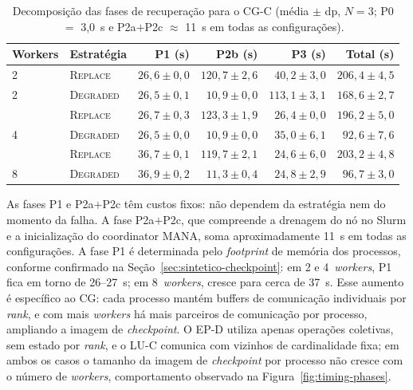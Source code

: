 \begin{table}[htb]
  \caption{Decomposição das fases de recuperação para o CG-C (média $\pm$ dp, $N=3$;
           P0 $=$ 3,0~s e P2a$+$P2c $\approx$ 11~s em todas as configurações).}
  \label{tab:cg-breakdown}
  \centering
  \small
  \begin{tabular}{l l r r r r}
    \toprule
    Workers & Estratégia & P1 (s) & P2b (s) & P3 (s) & Total (s) \\
    \midrule
    2 & \textsc{Replace}  & $26{,}6 \pm 0{,}0$ & $120{,}7 \pm 2{,}6$ & $40{,}2 \pm 3{,}0$  & $206{,}4 \pm 4{,}5$ \\
    2 & \textsc{Degraded} & $26{,}5 \pm 0{,}1$ & $10{,}9 \pm 0{,}0$  & $113{,}1 \pm 3{,}1$ & $168{,}6 \pm 2{,}7$ \\
    \addlinespace
    4 & \textsc{Replace}  & $26{,}7 \pm 0{,}3$ & $123{,}3 \pm 1{,}9$ & $26{,}4 \pm 0{,}0$  & $196{,}2 \pm 5{,}0$ \\
    4 & \textsc{Degraded} & $26{,}5 \pm 0{,}0$ & $10{,}9 \pm 0{,}0$  & $35{,}0 \pm 6{,}1$  & $92{,}6 \pm 7{,}6$  \\
    \addlinespace
    8 & \textsc{Replace}  & $36{,}7 \pm 0{,}1$ & $119{,}7 \pm 2{,}1$ & $24{,}6 \pm 6{,}0$  & $203{,}2 \pm 4{,}8$ \\
    8 & \textsc{Degraded} & $36{,}9 \pm 0{,}2$ & $11{,}3 \pm 0{,}4$  & $24{,}8 \pm 2{,}9$  & $96{,}7 \pm 3{,}0$  \\
    \bottomrule
  \end{tabular}
\end{table}

As fases P1 e P2a$+$P2c têm custos fixos: não dependem da estratégia nem do momento
da falha. A fase P2a$+$P2c, que compreende a drenagem do nó no Slurm e a inicialização
do coordinator MANA, soma aproximadamente 11~s em todas as configurações. A fase P1 é
determinada pelo \textit{footprint} de memória dos processos, conforme confirmado na
Seção~\ref{sec:sintetico-checkpoint}: em 2 e 4~\textit{workers}, P1 fica em torno de
26--27~s; em 8~\textit{workers}, cresce para cerca de 37~s. Esse aumento é específico ao CG: cada processo mantém buffers de comunicação
individuais por \textit{rank}, e com mais \textit{workers} há mais parceiros de
comunicação por processo, ampliando a imagem de \textit{checkpoint}. O EP-D utiliza
apenas operações coletivas, sem estado por \textit{rank}, e o LU-C comunica com
vizinhos de cardinalidade fixa; em ambos os casos o tamanho da imagem de
\textit{checkpoint} por processo não cresce com o número de \textit{workers},
comportamento observado na Figura~\ref{fig:timing-phases}.

